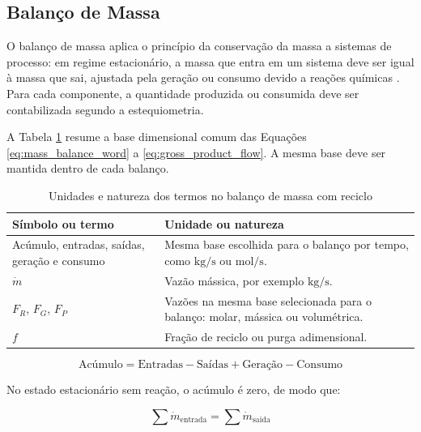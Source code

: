 \subsection{Balanço de Massa}

O balanço de massa aplica o princípio da conservação da massa a sistemas de processo: em regime estacionário, a massa que entra em um sistema deve ser igual à massa que sai, ajustada pela geração ou consumo devido a reações químicas \cite{felder2005}. Para cada componente, a quantidade produzida ou consumida deve ser contabilizada segundo a estequiometria.

A Tabela \ref{tab:unidades-balanco-massa} resume a base dimensional comum das Equações \ref{eq:mass_balance_word} a \ref{eq:gross_product_flow}. A mesma base deve ser mantida dentro de cada balanço.

\begin{table}[H]
    \centering
    \caption{Unidades e natureza dos termos no balanço de massa com reciclo}
    \label{tab:unidades-balanco-massa}
    \begin{tabular}{|p{}|p{}|}
        \hline
        \textbf{Símbolo ou termo} & \textbf{Unidade ou natureza} \\ \hline
        Acúmulo, entradas, saídas, geração e consumo & Mesma base escolhida para o balanço por tempo, como $\mathrm{kg/s}$ ou $\mathrm{mol/s}$. \\ \hline
        $\dot{m}$ & Vazão mássica, por exemplo $\mathrm{kg/s}$. \\ \hline
        $F_R$, $F_G$, $F_P$ & Vazões na mesma base selecionada para o balanço: molar, mássica ou volumétrica. \\ \hline
        $f$ & Fração de reciclo ou purga adimensional. \\ \hline
    \end{tabular}
\end{table}

\begin{equation}
\text{Acúmulo} = \text{Entradas} - \text{Saídas} + \text{Geração} - \text{Consumo}
\label{eq:mass_balance_word}
\end{equation}

No estado estacionário sem reação, o acúmulo é zero, de modo que:

\begin{equation}
\sum \dot{m}_{\mathrm{entrada}} = \sum \dot{m}_{\mathrm{saida}}
\label{eq:steady_state_mass_balance}
\end{equation}

